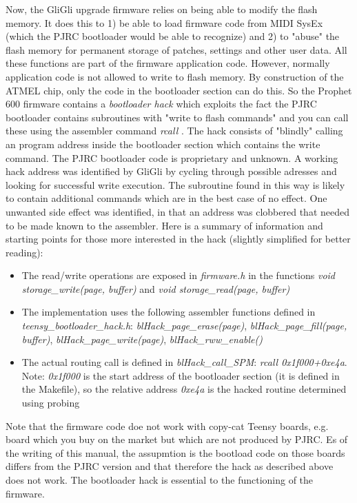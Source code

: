 Now, the GliGli upgrade firmware relies on being able to modify the flash memory. It does this to 1) be able to load firmware code from MIDI SysEx (which the PJRC bootloader would be able to recognize) and 2) to "abuse" the flash memory for permanent storage of patches, settings and other user data. All these functions are part of the firmware application code. However, normally application code is not allowed to write to flash memory. By construction of the ATMEL chip, only the code in the bootloader section can do this. So the Prophet 600 firmware contains a \textit{bootloader hack} which exploits the fact the PJRC bootloader contains subroutines with "write to flash commands" and you can call these using the assembler command \textit{rcall} . The hack consists of "blindly" calling an program address inside the bootloader section which contains the write command. The PJRC bootloader code is proprietary and unknown. A working hack address was identified by GliGli by cycling through possible adresses and looking for successful write execution. The subroutine found in this way is likely to contain additional commands which are in the best case of no effect. One unwanted side effect was identified, in that an address was clobbered that needed to be made known to the assembler. Here is a summary of information and starting points for those more interested in the hack (slightly simplified for better reading):

\begin{itemize}
  \item The read/write operations are exposed in \textit{firmware.h} in the functions \textit{void storage\_write(page, buffer)} and \textit{void storage\_read(page, buffer)} 
  \item The implementation uses the following assembler functions defined in \textit{teensy\_bootloader\_hack.h}: \textit{blHack\_page\_erase(page)}, \textit{blHack\_page\_fill(page, buffer)}, \textit{blHack\_page\_write(page)}, \textit{blHack\_rww\_enable()}
  \item The actual routing call is defined in \textit{blHack\_call\_SPM}: \textit{rcall 0x1f000+0xe4a}. Note: \textit{0x1f000} is the start address of the bootloader section (it is defined in the Makefile), so the relative address \textit{0xe4a} is the hacked routine determined using probing 
\end{itemize} 

Note that the firmware code doe not work with copy-cat Teensy boards, e.g. board which you buy on the market but which are not produced by PJRC. Es of the writing of this manual, the assupmtion is the bootload code on those boards differs from the PJRC version and that therefore the hack as described above does not work. The bootloader hack is essential to the functioning of the firmware.

